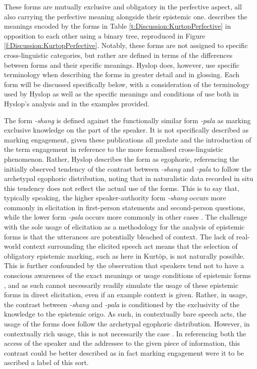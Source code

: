 These forms are mutually exclusive and obligatory in the perfective aspect, all also carrying the perfective meaning alongside their epistemic one.  describes the meanings encoded by the forms in Table \ref{t:Discussion:KurtopPerfective} in opposition to each other using a binary tree, reproduced in Figure \ref{f:Discussion:KurtopPerfective}. Notably, these forms are not assigned to specific cross-linguistic categories, but rather are defined in terms of the differences between forms and their specific meanings. Hyslop does, however, use specific terminology when describing the forms in greater detail and in glossing. Each form will be discussed specifically below, with a consideration of the terminology used by Hyslop as well as the specific meanings and conditions of use both in Hyslop's analysis and in the examples provided.

The form \textit{-shang} is defined against the functionally similar form \textit{-pala} as marking exclusive knowledge on the part of the speaker. It is not specifically described as marking engagement, given these publications all predate  and the introduction of the term engagement in reference to the more formalised cross-linguistic phenomenon. Rather, Hyslop describes the form as egophoric, referencing the initially observed tendency of the contrast between \textit{-shang} and \textit{-pala} to follow the archetypal egophoric distribution, noting that in naturalistic data recorded in situ this tendency does not reflect the actual use of the forms. This is to say that, typically speaking, the higher speaker-authority form \textit{-shang} occurs more commonly in elicitation in first-person statements and second-person questions, while the lower form \textit{-pala} occurs more commonly in other cases \cite[129]{Hyslop2018}. The challenge with the sole usage of elicitation as a methodology for the analysis of epistemic forms is that the utterances are potentially bleached of context. The lack of real-world context surrounding the elicited speech act means that the selection of obligatory epistemic marking, such as here in Kurtöp, is not naturally possible. This is further confounded by the observation that speakers tend not to have a conscious awareness of the exact meanings or usage conditions of epistemic forms \cite{Grzech2020}, and as such cannot necessarily readily simulate the usage of these epistemic forms in direct elicitation, even if an example context is given. Rather, in usage, the contrast between \textit{-shang} and \textit{-pala} is conditioned by the exclusivity of the knowledge to the epistemic origo. As such, in contextually bare speech acts, the usage of the forms does follow the archetypal egophoric distribution. However, in contextually rich usage, this is not necessarily the case \cite{Hyslop2018}. In referencing both the access of the speaker and the addressee to the given piece of information, this contrast could be better described as in fact marking engagement were it to be ascribed a label of this sort.

